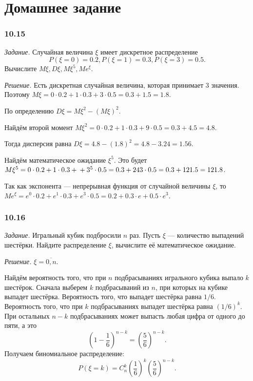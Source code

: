 \section*{Домашнее задание}

\subsubsection*{10.15}

\textit{Задание.} Случайная величина $ \xi $ имеет дискретное распределение
$$P \left( \xi = 0 \right) = 0.2,
P \left( \xi = 1 \right) = 0.3,
P \left( \xi = 3 \right) = 0.5.$$
Вычислите $M \xi, D \xi, M \xi^5, Me^{ \xi }$.

\textit{Решение.} Есть дискретная случайная величина, которая принимает 3 значения.
Поэтому $M \xi = 0 \cdot 0.2 + 1 \cdot 0.3 + 3 \cdot 0.5 = 0.3 + 1.5 = 1.8$.

По определению $D \xi = M \xi^2 - \left( M \xi \right)^2$.

Найдём второй момент $M \xi^2 = 0 \cdot 0.2 + 1 \cdot 0.3 + 9 \cdot 0.5 = 0.3 + 4.5 = 4.8$.

Тогда дисперсия равна $D \xi = 4.8 - \left( 1.8 \right)^2 = 4.8 - 3.24 = 1.56$.

Найдём математическое ожидание $ \xi^5$.
Это будет $M \xi^5 = 0 \cdot 0.2 + 1 \cdot 0.3 + \\
+ 3^5 \cdot 0.5 = 0.3 + 243 \cdot 0.5 = 0.3 + 121.5 = 121.8$.

Так как экспонента --- непрерывная функция от случайной величины $ \xi $, то $Me^{ \xi } = e^0 \cdot 0.2 + e^1 \cdot 0.3 + e^3 \cdot 0.5 = 0.2 + 0.3 \cdot e + 0.5 \cdot e^3$.

\subsubsection*{10.16}

\textit{Задание.} Игральный кубик подбросили $n$ раз.
Пусть $ \xi $ --- количество выпадений шестёрки.
Найдите распределение $ \xi $, вычислите её математическое ожидание.

\textit{Решение.} $ \xi = \overline{0, n}$.

Найдём вероятность того, что при $n$ подбрасываниях игрального кубика выпало $k$ шестёрок.
Сначала выберем $k$ подбрасываний из $n$, при которых на кубике выпадет шестёрка.
Вероятность того, что выпадет шестёрка равна $1/6$.
Вероятность того, что при $k$ подбрасываниях выпадет шестёрка равна $ \left( 1/6 \right)^k$.
При остальных $n - k$ подбрасываниях может выпасть любая цифра от одного до пяти, а это
$$ \left( 1 - \frac{1}{6} \right)^{n-k} =
\left( \frac{5}{6} \right)^{n-k}.$$
Получаем биномиальное распределение:
$$P \left( \xi = k \right) =
C_n^k \left( \frac{1}{6} \right)^k \left( \frac{5}{6} \right)^{n-k}.$$


